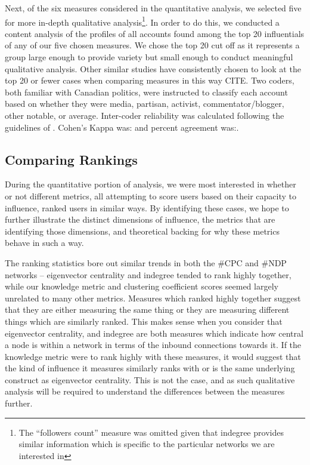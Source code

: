 \documentclass[a4paper,12pt]{article}
\begin{document}
Next, of the six measures considered in the quantitative analysis, we selected five for more in-depth qualitative analysis\footnote{The ``followers count'' measure was omitted given that indegree provides similar information which is specific to the particular networks we are interested in}. In order to do this, we conducted a content analysis of the profiles of all accounts found among the top 20 influentials of any of our five chosen measures. We chose the top 20 cut off as it represents a group large enough to provide variety but small enough to conduct meaningful qualitative analysis. Other similar studies have consistently chosen to look at the top 20 or fewer cases when comparing measures in this way CITE. Two coders, both familiar with Canadian politics, were instructed to classify each account based on whether they were media, partisan, activist, commentator/blogger, other notable, or average. Inter-coder reliability was calculated following the guidelines of \cite{lombardsnyderduchbracken}. Cohen's Kappa was: and percent agreement was:.

\subsection{Comparing Rankings}

During the quantitative portion of analysis, we were most interested in whether or not different metrics, all attempting to score users based on their capacity to influence, ranked users in similar ways. By identifying these cases, we hope to further illustrate the distinct dimensions of influence, the metrics that are identifying those dimensions, and theoretical backing for why these metrics behave in such a way.

The ranking statistics bore out similar trends in both the \#CPC and \#NDP networks -- eigenvector centrality and indegree tended to rank highly together, while our knowledge metric and clustering coefficient scores seemed largely unrelated to many other metrics. Measures which ranked highly together suggest that they are either measuring the same thing or they are measuring different things which are similarly ranked. This makes sense when you consider that eigenvector centrality, and indegree are both measures which indicate how central a node is within a network in terms of the inbound connections towards it. If the knowledge metric were to rank highly with these measures, it would suggest that the kind of influence it measures similarly ranks with or is the same underlying construct as eigenvector centrality. This is not the case, and as such qualitative analysis will be required to understand the differences between the measures further. 
\end{document}
